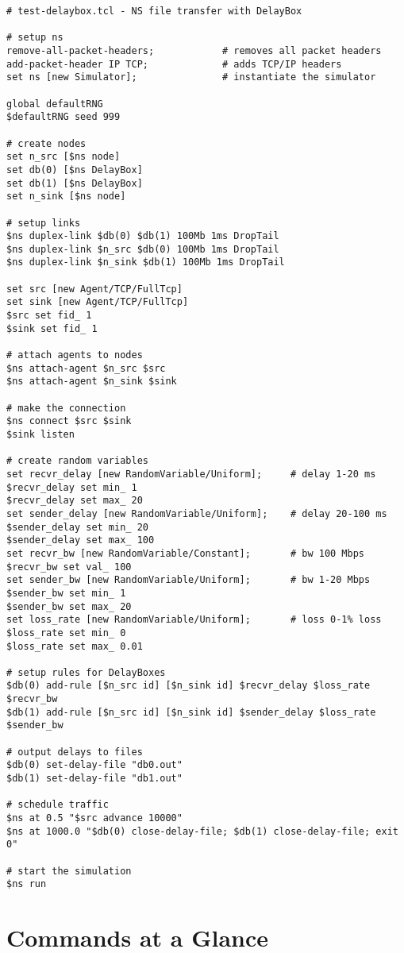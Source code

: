 \begin{verbatim}
# test-delaybox.tcl - NS file transfer with DelayBox

# setup ns
remove-all-packet-headers;            # removes all packet headers
add-packet-header IP TCP;             # adds TCP/IP headers
set ns [new Simulator];               # instantiate the simulator

global defaultRNG
$defaultRNG seed 999

# create nodes
set n_src [$ns node]
set db(0) [$ns DelayBox]
set db(1) [$ns DelayBox]
set n_sink [$ns node]

# setup links
$ns duplex-link $db(0) $db(1) 100Mb 1ms DropTail
$ns duplex-link $n_src $db(0) 100Mb 1ms DropTail
$ns duplex-link $n_sink $db(1) 100Mb 1ms DropTail

set src [new Agent/TCP/FullTcp]
set sink [new Agent/TCP/FullTcp]
$src set fid_ 1
$sink set fid_ 1

# attach agents to nodes
$ns attach-agent $n_src $src
$ns attach-agent $n_sink $sink

# make the connection
$ns connect $src $sink
$sink listen

# create random variables
set recvr_delay [new RandomVariable/Uniform];     # delay 1-20 ms
$recvr_delay set min_ 1 
$recvr_delay set max_ 20
set sender_delay [new RandomVariable/Uniform];    # delay 20-100 ms
$sender_delay set min_ 20
$sender_delay set max_ 100
set recvr_bw [new RandomVariable/Constant];       # bw 100 Mbps
$recvr_bw set val_ 100
set sender_bw [new RandomVariable/Uniform];       # bw 1-20 Mbps
$sender_bw set min_ 1
$sender_bw set max_ 20
set loss_rate [new RandomVariable/Uniform];       # loss 0-1% loss
$loss_rate set min_ 0
$loss_rate set max_ 0.01

# setup rules for DelayBoxes 
$db(0) add-rule [$n_src id] [$n_sink id] $recvr_delay $loss_rate $recvr_bw
$db(1) add-rule [$n_src id] [$n_sink id] $sender_delay $loss_rate $sender_bw

# output delays to files
$db(0) set-delay-file "db0.out"
$db(1) set-delay-file "db1.out"

# schedule traffic
$ns at 0.5 "$src advance 10000"
$ns at 1000.0 "$db(0) close-delay-file; $db(1) close-delay-file; exit 0"

# start the simulation
$ns run
\end{verbatim}
\section{Commands at a Glance}

